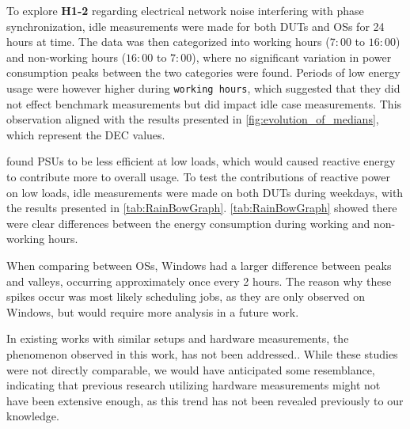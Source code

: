 
To explore \textbf{H1-2} regarding electrical network noise interfering with phase synchronization, idle measurements were made for both DUTs and OSs for 24 hours at time. The data was then categorized into working hours ($7:00$ to $16:00$) and non-working hours ($16:00$ to $7:00$), where no significant variation in power consumption peaks between the two categories were found. Periods of low energy usage were however higher during \texttt{working hours}, which suggested that they did not effect benchmark measurements but did impact idle case measurements. This observation aligned with the results presented in \cref{fig:evolution_of_medians}, which represent the DEC values.

\cite{PowerSupply} found PSUs to be less efficient at low loads, which would caused reactive energy to contribute more to overall usage. To test the contributions of reactive power on low loads, idle measurements were made on both DUTs during weekdays, with the results presented in  \cref{tab:RainBowGraph}. \cref{tab:RainBowGraph} showed there were clear differences between the energy consumption during working and non-working hours. 

When comparing between OSs, Windows had a larger difference between peaks and valleys, occurring approximately once every 2 hours. The reason why these spikes occur was most likely scheduling jobs, as they are only observed on Windows, but would require more analysis in a future work.

In existing works with similar setups and hardware measurements, the phenomenon observed in this work, has not been addressed.\cite{georgiou2020energy,Koedijk2022diff, khan2018rapl}. While these studies were not directly comparable, we would have anticipated some resemblance, indicating that previous research utilizing hardware measurements might not have been extensive enough, as this trend has not been revealed previously to our knowledge.

